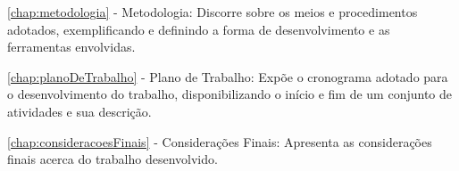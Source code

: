 \autoref{chap:metodologia} - Metodologia: Discorre sobre os meios e procedimentos adotados, exemplificando e definindo a forma de desenvolvimento e as ferramentas envolvidas. 

\autoref{chap:planoDeTrabalho} - Plano de Trabalho: Expõe o cronograma adotado para o desenvolvimento do trabalho, disponibilizando o início e fim de um conjunto de atividades e sua descrição. 

\autoref{chap:consideracoesFinais} - Considerações Finais: Apresenta as considerações finais acerca do trabalho desenvolvido.